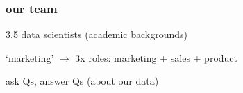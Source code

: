 \documentclass{beamer}
\begin{document}
\begin{frame} \frametitle{our team}

3.5 data scientists (academic backgrounds)

\vspace{0.3in}

`marketing'  $\to$ 3x roles: marketing + sales + product

\vspace{0.3in}

ask Qs, answer Qs (about our data)

\end{frame}


%
%
%
\end{document}
